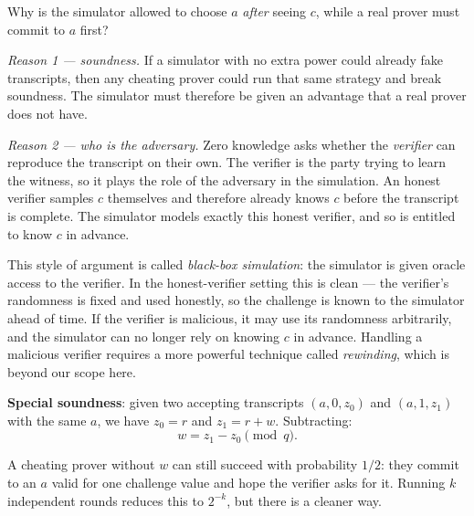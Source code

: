 \begin{tcolorbox}[enhanced, colback=teal!5!white, colframe=teal!50!black, boxrule=0.6pt, arc=2mm, left=5pt, right=5pt, top=4pt, bottom=4pt]
Why is the simulator allowed to choose $a$ \emph{after} seeing $c$, while a real prover must commit to $a$ first?

\medskip
\textit{Reason 1 --- soundness.} If a simulator with no extra power could already fake transcripts, then any cheating prover could run that same strategy and break soundness. The simulator must therefore be given an advantage that a real prover does not have.

\medskip
\textit{Reason 2 --- who is the adversary.} Zero knowledge asks whether the \emph{verifier} can reproduce the transcript on their own. The verifier is the party trying to learn the witness, so it plays the role of the adversary in the simulation. An honest verifier samples $c$ themselves and therefore already knows $c$ before the transcript is complete. The simulator models exactly this honest verifier, and so is entitled to know $c$ in advance.
\end{tcolorbox}

\medskip

\begin{tcolorbox}[enhanced, colback=teal!5!white, colframe=teal!50!black, boxrule=0.6pt, arc=2mm, left=5pt, right=5pt, top=4pt, bottom=4pt]
This style of argument is called \emph{black-box simulation}: the simulator is given oracle access to the verifier. In the honest-verifier setting this is clean --- the verifier's randomness is fixed and used honestly, so the challenge is known to the simulator ahead of time. If the verifier is malicious, it may use its randomness arbitrarily, and the simulator can no longer rely on knowing $c$ in advance. Handling a malicious verifier requires a more powerful technique called \emph{rewinding}, which is beyond our scope here.
\end{tcolorbox}

\textbf{Special soundness}: given two accepting transcripts $(a, 0, z_0)$ and $(a, 1, z_1)$ with the same $a$, we have $z_0 = r$ and $z_1 = r + w$. Subtracting:
\[
  w = z_1 - z_0 \pmod{q}.
\]

A cheating prover without $w$ can still succeed with probability $1/2$: they commit to an $a$ valid for one challenge value and hope the verifier asks for it. Running $k$ independent rounds reduces this to $2^{-k}$, but there is a cleaner way.


